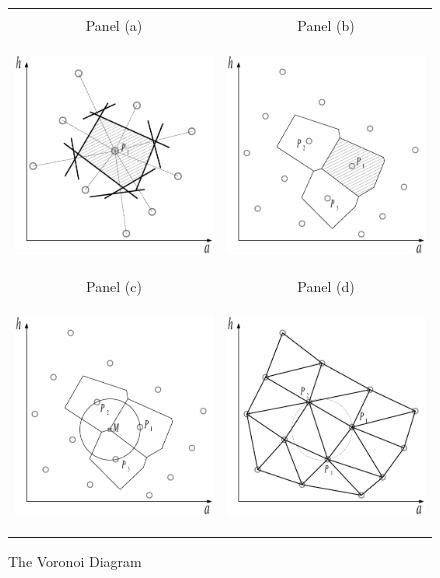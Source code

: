 \documentclass[a4paper,12pt]{article}%
\begin{document}
\begin{figure}[htb] \centering
\caption{The Voronoi Diagram}
\begin{tabular}
[c]{cc}
& \\
Panel (a) & Panel (b)\\
{\includegraphics[height=6.0cm, width=6.0cm]{Abbildungen/Voronoi_1_shape.eps}} &
{\includegraphics[height=6.0cm, width=6.0cm]{Abbildungen/Voronoi_2_shape.eps}} \\
Panel (c) & Panel (d)\\
{\includegraphics[height=6.0cm, width=6.0cm]{Abbildungen/Voronoi_3.eps}} &
{\includegraphics[height=6.0cm, width=6.0cm]{Abbildungen/Delaunay_!.eps}} \\

\end{tabular}
\end{figure}
\end{document}
